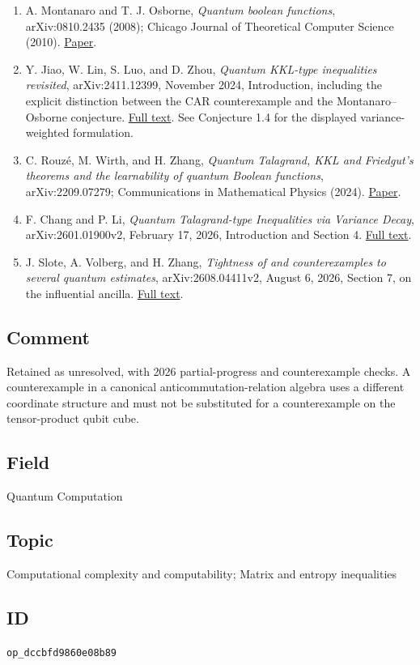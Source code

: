 \begin{enumerate}[label={},leftmargin=4.8em,labelsep=0.5em]
  \footnotesize
  \item[\textup{[Montanaro08]}]\label{ref:dccb-montanaro08}
  A. Montanaro and T. J. Osborne, \emph{Quantum boolean functions}, arXiv:0810.2435 (2008); Chicago Journal of Theoretical Computer Science (2010). \href{https://arxiv.org/abs/0810.2435}{Paper}.

  \item[\textup{[Jiao24]}]\label{ref:dccb-jiao24}
  Y. Jiao, W. Lin, S. Luo, and D. Zhou, \emph{Quantum KKL-type inequalities revisited}, arXiv:2411.12399, November 2024, Introduction, including the explicit distinction between the CAR counterexample and the Montanaro–Osborne conjecture. \href{https://arxiv.org/html/2411.12399}{Full text}. See Conjecture 1.4 for the displayed variance-weighted formulation.

  \item[\textup{[Rouz24]}]\label{ref:dccb-rouz24}
  C. Rouzé, M. Wirth, and H. Zhang, \emph{Quantum Talagrand, KKL and Friedgut's theorems and the learnability of quantum Boolean functions}, arXiv:2209.07279; Communications in Mathematical Physics (2024). \href{https://arxiv.org/abs/2209.07279}{Paper}.

  \item[\textup{[Chang26]}]\label{ref:dccb-chang26}
  F. Chang and P. Li, \emph{Quantum Talagrand-type Inequalities via Variance Decay}, arXiv:2601.01900v2, February 17, 2026, Introduction and Section 4. \href{https://arxiv.org/html/2601.01900v2}{Full text}.

  \item[\textup{[Slote26]}]\label{ref:dccb-slote26}
  J. Slote, A. Volberg, and H. Zhang, \emph{Tightness of and counterexamples to several quantum estimates}, arXiv:2608.04411v2, August 6, 2026, Section 7, on the influential ancilla. \href{https://arxiv.org/html/2608.04411v2}{Full text}.
\end{enumerate}

\subsection*{Comment}

Retained as unresolved, with 2026 partial-progress and counterexample checks. A counterexample in a canonical anticommutation-relation algebra uses a different coordinate structure and must not be substituted for a counterexample on the tensor-product qubit cube. 

\subsection*{Field}

Quantum Computation

\subsection*{Topic}

Computational complexity and computability; Matrix and entropy inequalities

\subsection*{ID}

\texttt{op\_dccbfd9860e08b89}

